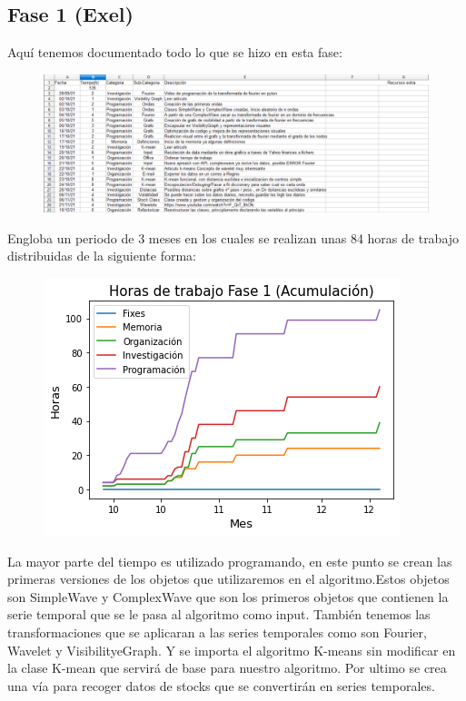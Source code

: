\documentclass[12pt,a4paper]{article}
\begin{document}
	\subsection{Fase 1 (Exel)}
	Aquí tenemos documentado todo lo que se hizo en esta fase:\\
\begin{figure}[H]
\centering
  \centering
  \includegraphics[width=1\linewidth]{exel fase 1}
\label{fig:subrgrafo}
\end{figure}
	Engloba un periodo de 3 meses en los cuales se realizan unas 84 horas de trabajo distribuidas de la siguiente forma:\\
	\begin{figure}[H]
\centering
  \centering
  \includegraphics[width=0.5\linewidth]{tiempo fase 1}
\label{fig:subrgrafo}
\end{figure}
	La mayor parte del tiempo es utilizado programando, en este punto se crean las primeras versiones de los objetos que utilizaremos en el algoritmo.Estos objetos son SimpleWave y ComplexWave que son los primeros objetos que contienen la serie temporal que se le pasa al algoritmo como input. También tenemos las transformaciones que se aplicaran a las series temporales como son Fourier, Wavelet y VisibilityeGraph. Y se importa el algoritmo K-means sin modificar en la clase K-mean que servirá de base para nuestro algoritmo. Por ultimo se crea una vía para recoger datos de stocks que se convertirán en series temporales.\\
	
\end{document}
